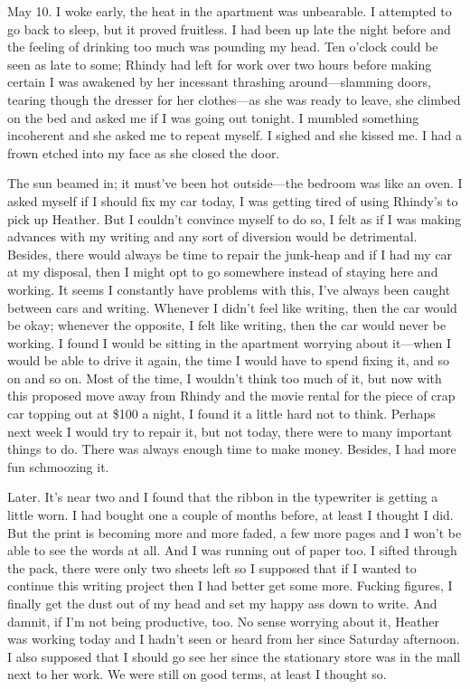 May 10. I woke early, the heat in the apartment was unbearable. I
attempted to go back to sleep, but it proved fruitless. I had been up
late the night before and the feeling of drinking too much was pounding
my head. Ten o'clock could be seen as late to some; Rhindy had left for
work over two hours before making certain I was awakened by her
incessant thrashing around---slamming doors, tearing though the dresser
for her clothes---as she was ready to leave, she climbed on the bed and
asked me if I was going out tonight. I mumbled something incoherent and
she asked me to repeat myself. I sighed and she kissed me. I had a frown
etched into my face as she closed the door.

The sun beamed in; it must've been hot outside---the bedroom was like an
oven. I asked myself if I should fix my car today, I was getting tired
of using Rhindy's to pick up Heather. But I couldn't convince myself to
do so, I felt as if I was making advances with my writing and any sort
of diversion would be detrimental. Besides, there would always be time
to repair the junk-heap and if I had my car at my disposal, then I might
opt to go somewhere instead of staying here and working. It seems I
constantly have problems with this, I've always been caught between cars
and writing. Whenever I didn't feel like writing, then the car would be
okay; whenever the opposite, I felt like writing, then the car would
never be working. I found I would be sitting in the apartment worrying
about it---when I would be able to drive it again, the time I would have
to spend fixing it, and so on and so on. Most of the time, I wouldn't
think too much of it, but now with this proposed move away from Rhindy
and the movie rental for the piece of crap car topping out at \$100 a
night, I found it a little hard not to think. Perhaps next week I would
try to repair it, but not today, there were to many important things to
do. There was always enough time to make money. Besides, I had more fun
schmoozing it.

Later. It's near two and I found that the ribbon in the typewriter is
getting a little worn. I had bought one a couple of months before, at
least I thought I did. But the print is becoming more and more faded, a
few more pages and I won't be able to see the words at all. And I was
running out of paper too. I sifted through the pack, there were only two
sheets left so I supposed that if I wanted to continue this writing
project then I had better get some more. Fucking figures, I finally get
the dust out of my head and set my happy ass down to write. And damnit,
if I'm not being productive, too. No sense worrying about it, Heather
was working today and I hadn't seen or heard from her since Saturday
afternoon. I also supposed that I should go see her since the stationary
store was in the mall next to her work. We were still on good terms, at
least I thought so.

